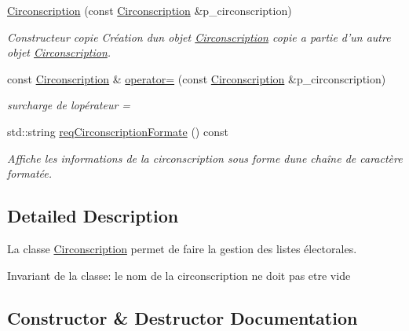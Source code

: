 \begin{DoxyCompactItemize}
\hyperlink{classelections_1_1Circonscription_ab97d93c0108451f646ec8101caa39999}{Circonscription} (const \hyperlink{classelections_1_1Circonscription}{Circonscription} \&p\+\_\+circonscription)
\begin{DoxyCompactList}\small\item\em Constructeur copie Création d\textquotesingle{}un objet \hyperlink{classelections_1_1Circonscription}{Circonscription} copie a partie d’un autre objet \hyperlink{classelections_1_1Circonscription}{Circonscription}. \end{DoxyCompactList}\item 
const \hyperlink{classelections_1_1Circonscription}{Circonscription} \& \hyperlink{classelections_1_1Circonscription_ab61ae982ba5f251ee1ac20bd660498b1}{operator=} (const \hyperlink{classelections_1_1Circonscription}{Circonscription} \&p\+\_\+circonscription)
\begin{DoxyCompactList}\small\item\em surcharge de l\textquotesingle{}opérateur = \end{DoxyCompactList}\item 
std\+::string \hyperlink{classelections_1_1Circonscription_aeea7de1ad15f781187aec0f0e01a14f4}{req\+Circonscription\+Formate} () const
\begin{DoxyCompactList}\small\item\em Affiche les informations de la circonscription sous forme d\textquotesingle{}une chaîne de caractère formatée. \end{DoxyCompactList}\end{DoxyCompactItemize}


\subsection{Detailed Description}
La classe \hyperlink{classelections_1_1Circonscription}{Circonscription} permet de faire la gestion des listes électorales. 

\begin{DoxyInvariant}{Invariant}
de la classe\+: le nom de la circonscription ne doit pas etre vide 
\end{DoxyInvariant}


\subsection{Constructor \& Destructor Documentation}
\mbox{\label{classelections_1_1Circonscription_a73b7ff6d629d356fc9a38337848d5e00}} 
